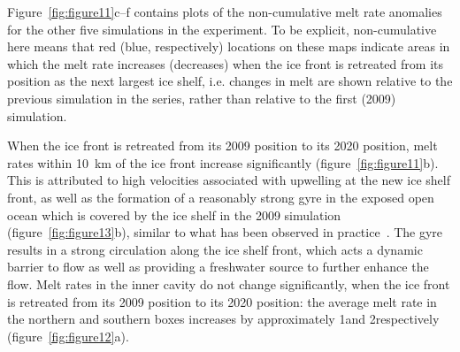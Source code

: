 \documentclass[draft]{agujournal2019}
\begin{document}
Figure~\ref{fig:figure11}c--f contains plots of the non-cumulative melt rate anomalies for the other five simulations in the experiment. To be explicit, non-cumulative here means that red (blue, respectively) locations on these maps indicate areas in which the melt rate increases (decreases) when the ice front is retreated from its position as the next largest ice shelf, i.e. changes in melt are shown relative to the previous simulation in the series, rather than relative to the first (2009) simulation.

When the ice front is retreated from its 2009 position to its 2020 position, melt rates within 10~km of the ice front increase significantly (figure~\ref{fig:figure11}b). This is attributed to high velocities associated with upwelling at the new ice shelf front, as well as the formation of a reasonably strong gyre in the exposed open ocean which is covered by the ice shelf in the 2009 simulation (figure~\ref{fig:figure13}b), similar to what has been observed in practice~\cite{Yoon2021}. The gyre results in a strong circulation along the ice shelf front, which acts a dynamic barrier to flow as well as providing a freshwater source to further enhance the flow. Melt rates in the inner cavity do not change significantly, when the ice front is retreated from its 2009 position to its 2020 position: the average melt rate in the northern and southern boxes increases by approximately 1\mpryr and 2\mpryr respectively (figure~\ref{fig:figure12}a).
\end{document}
